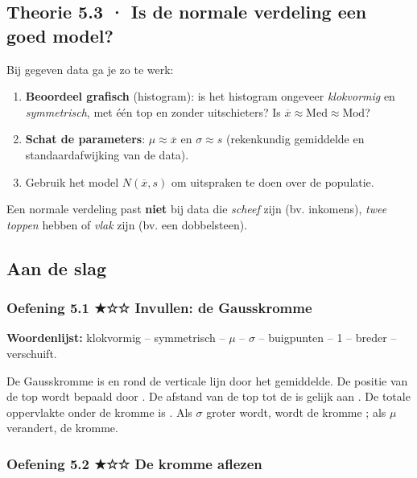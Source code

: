 \subsection*{Theorie 5.3 · Is de normale verdeling een goed model?}

\begin{theorie}
Bij gegeven data ga je zo te werk:

\begin{enumerate}
\item \textbf{Beoordeel grafisch} (histogram): is het histogram ongeveer \emph{klokvormig} en \emph{symmetrisch}, met één top en zonder uitschieters? Is $\overline{x}\approx \text{Med}\approx \text{Mod}$?
\item \textbf{Schat de parameters}: $\mu\approx\overline{x}$ en $\sigma\approx s$ (rekenkundig gemiddelde en standaardafwijking van de data).
\item Gebruik het model $N(\overline{x},s)$ om uitspraken te doen over de populatie.
\end{enumerate}

Een normale verdeling past \textbf{niet} bij data die \emph{scheef} zijn (bv. inkomens), \emph{twee toppen} hebben of \emph{vlak} zijn (bv. een dobbelsteen).
\end{theorie}

\subsection*{Aan de slag}

\subsubsection*{Oefening 5.1 \quad ★☆☆ \quad Invullen: de Gausskromme}

\textbf{Woordenlijst:} klokvormig – symmetrisch – $\mu$ – $\sigma$ – buigpunten – 1 – breder – verschuift.

De Gausskromme is  en  rond de verticale lijn door het gemiddelde. De positie van de top wordt bepaald door \gat{$\mu$}. De afstand van de top tot de  is gelijk aan \gat{$\sigma$}. De totale oppervlakte onder de kromme is . Als $\sigma$ groter wordt, wordt de kromme ; als $\mu$ verandert,  de kromme.

\subsubsection*{Oefening 5.2 \quad ★☆☆ \quad De kromme aflezen}

